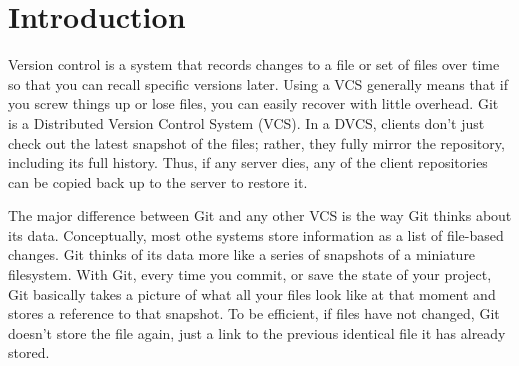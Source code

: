 \section{Introduction}

Version control is a system that records changes to a file or set of files over
time so that you can recall specific versions later. Using a VCS generally means
that if you screw things up or lose files, you can easily recover with little
overhead. Git is a Distributed Version Control System (VCS). In a DVCS, clients
don't just check out the latest snapshot of the files; rather, they fully mirror
the repository, including its full history. Thus, if any server dies, any of the
client repositories can be copied back up to the server to restore it.

The major difference between Git and any other VCS is the way Git thinks about
its data. Conceptually, most othe systems store information as a list of
file-based changes. Git thinks of its data more like a series of snapshots of a
miniature filesystem. With Git, every time you commit, or save the state of your
project, Git basically takes a picture of what all your files look like at that
moment and stores a reference to that snapshot. To be efficient, if files have
not changed, Git doesn't store the file again, just a link to the previous
identical file it has already stored.

